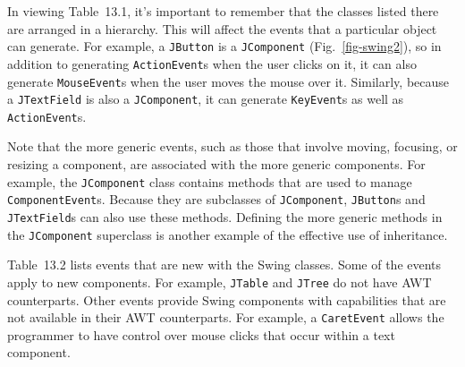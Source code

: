 In viewing Table~13.1, it's important to remember that the
classes listed there are arranged in a hierarchy.  This will affect the
events that a particular object can generate.  For example, a
{\tt JButton} is a {\tt JComponent} (Fig.~\ref{fig-swing2}), so in addition
to generating {\tt ActionEvent}s when the user clicks on it, it can
also generate {\tt MouseEvent}s when the user moves the mouse over
it.   Similarly, because a {\tt JTextField} is also a {\tt JComponent},
it can generate {\tt KeyEvent}s as well as {\tt ActionEvent}s.

Note that the more generic events, such as those that involve moving,
focusing, or resizing a component, are associated with the more
generic components.  For example, the {\tt JComponent} class contains
methods that are used to manage {\tt ComponentEvent}s.  Because they
are subclasses of {\tt JComponent}, {\tt JButton}s and {\tt
JTextField}s can also use these methods.  Defining the more generic
methods in the {\tt JComponent} superclass is another example of the
effective use of inheritance.



Table~13.2 lists events that are new with the Swing
classes.  Some of the events apply to new components.  For example,
{\tt JTable} and {\tt JTree} do not have AWT counterparts.  Other events
provide Swing components with capabilities that are not available in
their AWT counterparts.   For example, a {\tt CaretEvent} allows the
programmer to have control over mouse clicks that occur within a
text component.

